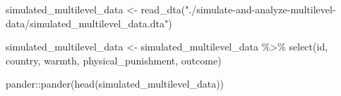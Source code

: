\documentclass[
  letterpaper,
  DIV=11,
  numbers=noendperiod]{scrreprt}
\newenvironment{Shaded}{\begin{snugshade}}{\end{snugshade}}
\newcommand{\FunctionTok}[1]{\textcolor[rgb]{0.28,0.35,0.67}{#1}}
\newcommand{\NormalTok}[1]{\textcolor[rgb]{0.00,0.23,0.31}{#1}}
\newcommand{\OtherTok}[1]{\textcolor[rgb]{0.00,0.23,0.31}{#1}}
\newcommand{\SpecialCharTok}[1]{\textcolor[rgb]{0.37,0.37,0.37}{#1}}
\newcommand{\StringTok}[1]{\textcolor[rgb]{0.13,0.47,0.30}{#1}}
\begin{document}
\begin{Shaded}
\begin{Highlighting}[]
\NormalTok{simulated\_multilevel\_data }\OtherTok{\textless{}{-}}
  \FunctionTok{read\_dta}\NormalTok{(}\StringTok{"./simulate{-}and{-}analyze{-}multilevel{-}data/simulated\_multilevel\_data.dta"}\NormalTok{)}

\NormalTok{simulated\_multilevel\_data }\OtherTok{\textless{}{-}}\NormalTok{ simulated\_multilevel\_data }\SpecialCharTok{\%\textgreater{}\%} 
  \FunctionTok{select}\NormalTok{(id, country,}
\NormalTok{         warmth,}
\NormalTok{         physical\_punishment,}
\NormalTok{         outcome)}
\end{Highlighting}
\end{Shaded}

\begin{Shaded}
\begin{Highlighting}[]
\NormalTok{pander}\SpecialCharTok{::}\FunctionTok{pander}\NormalTok{(}\FunctionTok{head}\NormalTok{(simulated\_multilevel\_data))}
\end{Highlighting}
\end{Shaded}
\end{document}
